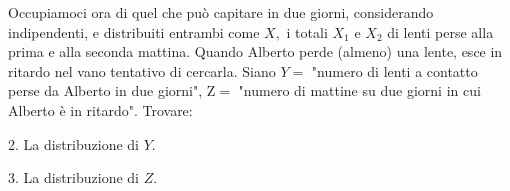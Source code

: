 Occupiamoci ora di quel che può capitare in due giorni, considerando indipendenti, e distribuiti entrambi come $X,$ i totali $X_{1}$ e $X_{2}$ di lenti perse alla prima e alla seconda mattina. Quando Alberto perde (almeno) una lente, esce in ritardo nel vano tentativo di cercarla. Siano $Y=$ "numero di lenti a contatto perse da Alberto in due giorni", $\mathrm{Z} =$ "numero di mattine su due giorni in cui Alberto è in ritardo". Trovare:

2. La distribuzione di $Y$.

3. La distribuzione di $Z$.

\ParteSoluzioni


